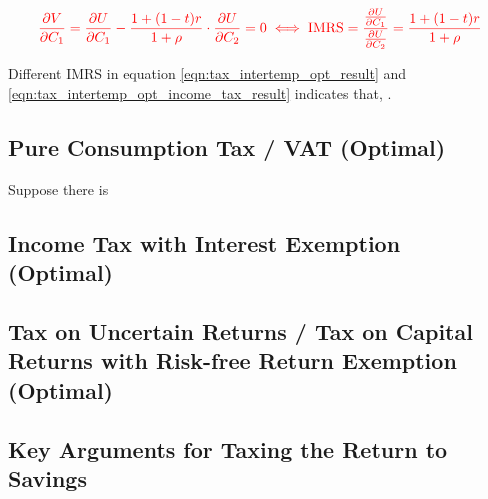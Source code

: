         \begin{equation}
            \color{red}
            \frac{\partial V}{\partial C_1} = \frac{\partial U}{\partial C_1} - \frac{1+(1-t)r}{1+\rho} \cdot \frac{\partial U}{\partial C_2} = 0
            \iff
            \text{IMRS} = \frac{\frac{\partial U}{\partial C_1}}{\frac{\partial U}{\partial C_2}} = \frac{1+(1-t)r}{1+\rho}
            \label{eqn:tax_intertemp_opt_income_tax_result}
        \end{equation}

        Different IMRS in equation \ref{eqn:tax_intertemp_opt_result} and \ref{eqn:tax_intertemp_opt_income_tax_result} indicates that, .

    \subsection{Pure Consumption Tax / VAT (Optimal)}

        Suppose there is 

    \subsection{Income Tax with Interest Exemption (Optimal)}

    \subsection{Tax on Uncertain Returns / Tax on Capital Returns with Risk-free Return Exemption (Optimal)}

    \subsection{Key Arguments for Taxing the Return to Savings}